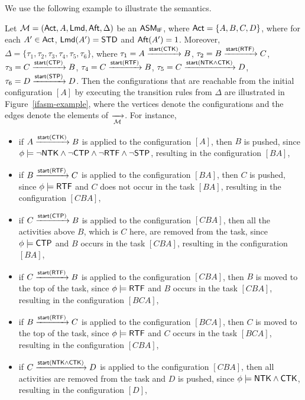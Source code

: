 We use the following example to illustrate the semantics.
\begin{example}
	Let ${\mathcal{M} } = ({\sf Act},A,{\sf Lmd},{\sf Aft},\Delta)$ be an $\textsf{ASM}_\textsf{IF}$, where ${\sf Act} = \{A,B,C,D\}$, where for each $A'\in{\sf Act}$, ${\sf Lmd}(A') = \mathsf{STD}$ and ${\sf Aft}(A') = 1$. 
	Moreover, $\Delta = \{\tau_1, \tau_2, \tau_3, \tau_4, \tau_5, \tau_6\}$, where 
	$\tau_1 = A \xrightarrow{{\mathsf{start} }({\sf CTK})} B$,
	$\tau_2 = B \xrightarrow{{\mathsf{start} }({\sf RTF})} C$,
	$\tau_3 = C \xrightarrow{{\mathsf{start} }({\sf CTP})} B$,
	$\tau_4 = C \xrightarrow{{\mathsf{start} }({\sf RTF})} B$,
	$\tau_5 = C \xrightarrow{{\mathsf{start} }({\sf NTK}\wedge{\sf CTK})} D$,
	$\tau_6 = D \xrightarrow{{\mathsf{start} }({\sf STP})} D$.
	Then the configurations that are reachable from the initial configuration $[A]$ by executing the transition rules from $\Delta$ are illustrated in Figure~\ref{ifasm-example}, where the vertices denote the configurations and the edges denote the elements of $\xrightarrow[{\mathcal{M} }]{}$. 
	For instance, 
	\begin{itemize}
		\item if $A \xrightarrow{{\mathsf{start} }({\sf CTK})} B$ is applied to the configuration $[A]$, then $B$ is pushed, since $\phi\models\neg{\sf NTK} \wedge \neg {\sf CTP} \wedge \neg {\sf RTF} \wedge \neg {\sf STP}$, resulting in the configuration $[BA]$,
		\item if $B \xrightarrow{{\mathsf{start} }({\sf RTF})} C$ is applied to the configuration $[BA]$, then $C$ is pushed, since $\phi\models{\sf RTF}$ and $C$ does not occur in the task $[BA]$, resulting in the configuration $[CBA]$,
		\item if $C \xrightarrow{{\mathsf{start} }({\sf CTP})} B$ is applied to the configuration $[CBA]$, then all the activities above $B$, which is $C$ here, are removed from the task, since $\phi\models{\sf CTP}$ and $B$ occurs in the task $[CBA]$, resulting in the configuration $[BA]$,
		\item if $C \xrightarrow{{\mathsf{start} }({\sf RTF})} B$ is applied to the configuration $[CBA]$, then $B$ is moved to the top of the task, since $\phi\models{\sf RTF}$ and $B$ occurs in the task $[CBA]$, resulting in the configuration $[BCA]$,
		\item if $B \xrightarrow{{\mathsf{start} }({\sf RTF})} C$ is applied to the configuration $[BCA]$, then $C$ is moved to the top of the task, since $\phi\models{\sf RTF}$ and $C$ occurs in the task $[BCA]$, resulting in the configuration $[CBA]$,
		\item if $C \xrightarrow{{\mathsf{start} }({\sf NTK}\wedge{\sf CTK})} D$ is applied to the configuration $[CBA]$, then all activities are removed from the task and $D$ is pushed, since $\phi\models{\sf NTK}\wedge{\sf CTK}$, resulting in the configuration $[D]$,

\end{itemize}
\end{example}
